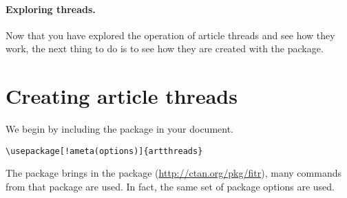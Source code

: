 \documentclass{article}
\begin{document}
\begin{multicols}{2}
\paragraph*{Exploring threads.} Now that you have explored the operation of
article threads and see how they work, the next thing to do is to see how
they are created with the  package.
\end{multicols}

\section{Creating article threads}

We begin by including the  package in your document.
\begin{Verbatim}[xleftmargin=\amtIndent,commandchars=!()]
\usepackage[!ameta(options)]{artthreads}
\end{Verbatim}
The  package brings in the  package
(\url{http://ctan.org/pkg/fitr}), many commands from that package are used.
In fact, the same set of package options are used.

%
\end{document}
